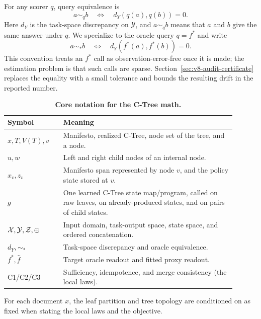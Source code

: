 For any scorer \(q\), query equivalence is
\[
  a\sim_q b
  \quad\Longleftrightarrow\quad
  d_Y(q(a),q(b))=0 .
\]
Here \(d_Y\) is the task-space discrepancy on \(\mathcal Y\), and
\(a\sim_q b\) means that \(a\) and \(b\) give the same answer under
\(q\). We specialize to the oracle query \(q=f^\ast\) and write
\[
  a\sim_\ast b
  \quad\Longleftrightarrow\quad
  d_Y(f^\ast(a),f^\ast(b))=0 .
\]
This convention treats an \(f^\ast\) call as observation-error-free
once it is made; the estimation problem is that such calls are sparse.
Section~\ref{sec:v8-audit-certificate} replaces the equality with a
small tolerance and bounds the resulting drift in the reported number.

\begin{table}[t]
  \centering
  \small
  \begin{tabular}{@{}p{0.22\linewidth}p{0.68\linewidth}@{}}
    \toprule
    Symbol & Meaning \\
    \midrule
    \(x,T,V(T),v\) & Manifesto, realized C-Tree, node set of the tree, and a node. \\
    \(u,w\) & Left and right child nodes of an internal node. \\
    \(x_v,z_v\) & Manifesto span represented by node \(v\), and the policy state stored at \(v\). \\
    \(g\) & One learned C-Tree state map/program, called on raw leaves, on already-produced states, and on pairs of child states. \\
    \(\mathcal X,\mathcal Y,\mathcal Z,\oplus\) & Input domain, task-output space, state space, and ordered concatenation. \\
    \(d_Y,\sim_\ast\) & Task-space discrepancy and oracle equivalence. \\
    \(f^\ast,\widehat f\) & Target oracle readout and fitted proxy readout. \\
    C1/C2/C3 & Sufficiency, idempotence, and merge consistency (the local laws). \\
    \bottomrule
  \end{tabular}
  \caption{\textbf{Core notation for the C-Tree math.}}
  \label{tab:v8-core-notation}
\end{table}

\begin{assumption}\label{ass:v8-fixed-tree}
For each document \(x\), the leaf partition and tree topology are conditioned
on as fixed when stating the local laws and the objective.
\end{assumption}

